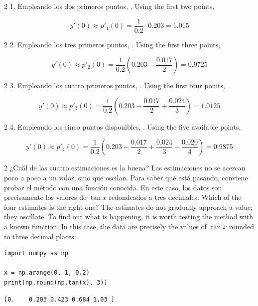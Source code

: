 \begin{paracol}{2}
1. Empleando los dos primeros puntos,
. Using the first two points,
\end{paracol}
\begin{equation*}
y'(0)\approx p'_1(0)=\frac{1}{0.2}\cdot 0.203= 1.015
\end{equation*}
\begin{paracol}{2}
2. Empleando los tres primeros puntos,
. Using the first three points,
\end{paracol}
\begin{equation*}
y'(0)\approx p'_2(0)=\frac{1}{0.2}\left( 0.203-\frac{0.017}{2}\right)= 0.9725
\end{equation*}
\begin{paracol}{2}
3. Empleando los cuatro primeros puntos,
. Using the first four points,
\end{paracol}
\begin{equation*}
y'(0)\approx p'_3(0)=\frac{1}{0.2}\left( 0.203-\frac{0.017}{2}+\frac{0.024}{3}\right)= 1.0125
\end{equation*}
\begin{paracol}{2}
4. Empleando los cinco puntos disponibles,
. Using the five available points,
\end{paracol}
\begin{equation*}
y'(0)\approx p'_4(0)=\frac{1}{0.2}\left( 0.203-\frac{0.017}{2}+\frac{0.024}{3}-\frac{0.020}{4}\right)= 0.9875
\end{equation*}
\begin{paracol}{2}
¿Cuál de las cuatro estimaciones es la buena? Las estimaciones no se acercan poco a poco a un valor, sino que oscilan. Para saber qué está pasando, conviene probar el método con una función conocida. En este caso, los datos son precisamente los valores de $\tan x$ redondeados a tres decimales:
\switchcolumn
Which of the four estimates is the right one? The estimates do not gradually approach a value; they oscillate. To find out what is happening, it is worth testing the method with a known function. In this case, the data are precisely the values of $\tan x$ rounded to three decimal places:
\end{paracol}
\begin{verbatim}
import numpy as np

x = np.arange(0, 1, 0.2)
print(np.round(np.tan(x), 3))
\end{verbatim}
\begin{verbatim}
[0.    0.203 0.423 0.684 1.03 ]
\end{verbatim}
